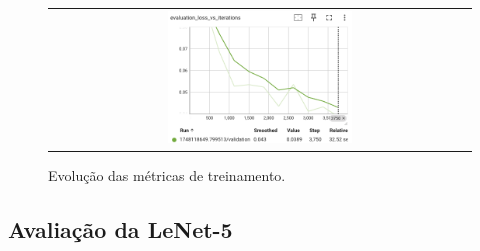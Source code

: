 \documentclass[a4paper,12pt]{article}
\begin{document}
\begin{figure}[htbp]
\begin{tabular}{cc}
        \multicolumn{2}{c}{%
            \includegraphics[width=0.45\textwidth]{evaluation_loss_vs_iterations.png}%
        } \\
    \end{tabular}
    \caption{Evolução das métricas de treinamento.}
    \label{fig:images-grid}
\end{figure}

\newpage
\subsection{Avaliação da LeNet-5}
\end{document}
